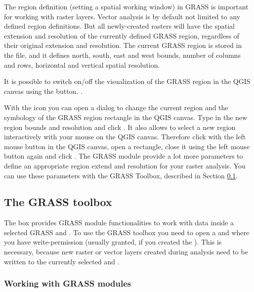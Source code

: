 The region definition (setting a spatial working window) in GRASS is important 
for working with raster layers. Vector analysis is by default not limited
to any defined region definitions. But all newly-created rasters will have the
spatial extension and resolution of the currently defined GRASS region,
regardless of their original extension and resolution. The current GRASS
region is stored in the  file, and it 
defines north, south, east and west bounds, number of columns and rows, 
horizontal and vertical spatial resolution.

It is possible to switch on/off the visualization of the GRASS region in the
QGIS canvas using the 
button. .

With the  icon you 
can open a dialog to change the current region and the symbology of the GRASS 
region rectangle in the QGIS canvas. Type in the new region bounds and 
resolution and click . It also allows to select a new region 
interactively with your mouse on the QGIS canvas. Therefore click with the 
left mouse button in the QGIS canvas, open a rectangle, close it using the 
left mouse button again and click .
The GRASS module  provide a lot more parameters to define 
an appropriate region extend and resolution for your raster analysis. You can 
use these parameters with the GRASS Toolbox, described in Section 
\ref{subsec:grass_toolbox}.

\subsection{The GRASS toolbox}\label{subsec:grass_toolbox}

The  box provides GRASS module 
functionalities to work with data inside a selected GRASS  
and . To use the GRASS toolbox you need to open a 
 and  where you have write-permission 
(usually granted, if you created the ). This is necessary, 
because new raster or vector layers created during analysis need to be written 
to the currently selected  and .

\subsubsection{Working with GRASS modules}\label{grass_modules}

